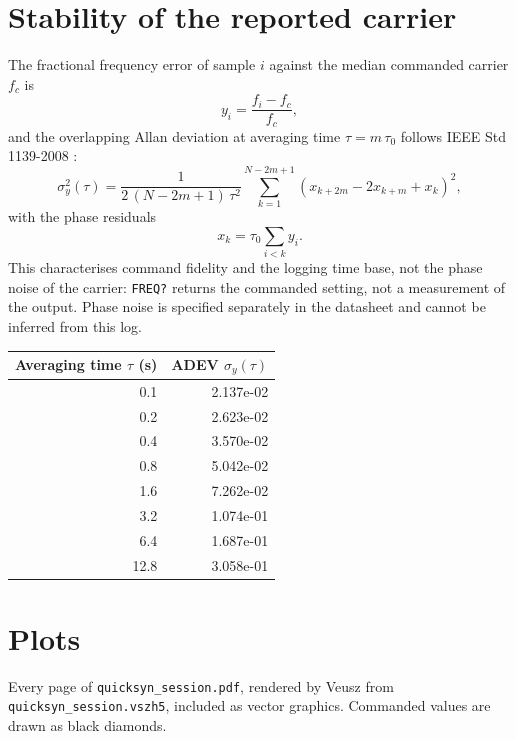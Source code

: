 \documentclass[11pt]{article}
\begin{document}
\section{Stability of the reported carrier}

The fractional frequency error of sample $i$ against the median
commanded carrier $f_c$ is
\begin{equation}
  y_i = \frac{f_i - f_c}{f_c},
\end{equation}
and the overlapping Allan deviation at averaging time $\tau = m\,\tau_0$
follows IEEE Std 1139-2008 \cite{ieee1139}:
\begin{equation}
  \sigma_y^2(\tau) = \frac{1}{2\,(N-2m+1)\,\tau^2}
  \sum_{k=1}^{N-2m+1}\left(x_{k+2m} - 2x_{k+m} + x_k\right)^2,
\end{equation}
with the phase residuals
\begin{equation}
  x_k = \tau_0 \sum_{i<k} y_i .
\end{equation}
This characterises command fidelity and the logging time base, not the
phase noise of the carrier: \texttt{FREQ?} returns the commanded setting,
not a measurement of the output. Phase noise is specified separately in
the datasheet \cite{nidatasheet} and cannot be inferred from this log.

\begin{center}
\begin{tabular}{@{}rr@{}}
\toprule
\textbf{Averaging time $\tau$ (s)} & \textbf{ADEV $\sigma_y(\tau)$} \\
\midrule
0.1 & 2.137e-02 \\
0.2 & 2.623e-02 \\
0.4 & 3.570e-02 \\
0.8 & 5.042e-02 \\
1.6 & 7.262e-02 \\
3.2 & 1.074e-01 \\
6.4 & 1.687e-01 \\
12.8 & 3.058e-01 \\
\bottomrule
\end{tabular}
\end{center}

\clearpage
\section{Plots}

Every page of \texttt{quicksyn\_session.pdf}, rendered by
Veusz \cite{veusz} from \texttt{quicksyn\_session.vszh5}, included as vector
graphics. Commanded values are drawn as black diamonds.
\end{document}
